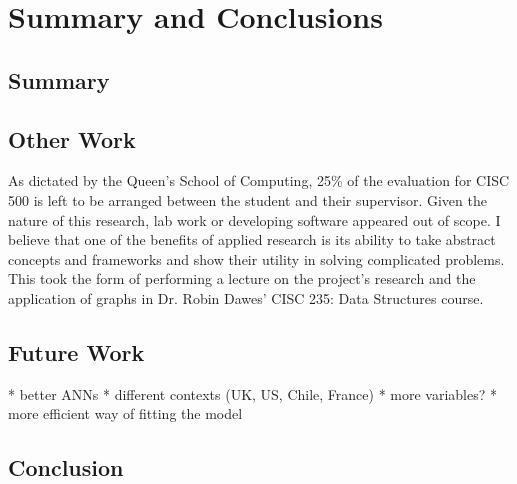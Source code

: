 \chapter{Summary and Conclusions}\label{ch:Conclusion}

\section{Summary}

\section{Other Work}

As dictated by the Queen’s School of Computing, 25\% of the evaluation for CISC
500 is left to be arranged between the student and their supervisor. Given the
nature of this research, lab work or developing software appeared out of scope.
I believe that one of the benefits of applied research is its ability to take
abstract concepts and frameworks and show their utility in solving complicated
problems. This took the form of performing a lecture on the project's research
and the application of graphs in Dr. Robin Dawes’ CISC 235: Data Structures course.

\section{Future Work}

* better ANNs 
* different contexts (UK, US, Chile, France)
* more variables?
* more efficient way of fitting the model

\section{Conclusion}
